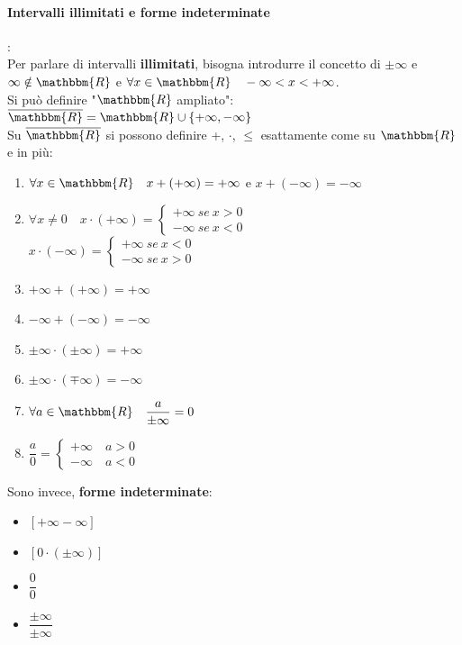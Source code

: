 \documentclass[12pt]{report}
\begin{document}
	\paragraph{Intervalli illimitati e forme indeterminate}: \\
	Per parlare di intervalli \textbf{illimitati}, bisogna introdurre il concetto di $\pm \infty$ e $\infty \notin \mathbbm{R}$ e $\forall x \in \mathbbm{R} \quad -\infty < x < +\infty$. \\
	Si può definire "$\mathbbm{R}$ ampliato": $\overline{\mathbbm{R}} = \mathbbm{R} \cup \{+\infty, -\infty\}$ \\
	Su $\overline{\mathbbm{R}}$ si possono definire +, $\cdot$, $\leq$ esattamente come su $\mathbbm{R}$ e in più:
	\begin{enumerate}
		\item $\forall x \in \mathbbm{R} \quad x + (+\infty) = +\infty$ e $x + (-\infty) = -\infty$
		\item $\forall x \neq 0 \quad x \cdot (+\infty) = \begin{cases}
			+\infty \ se \ x > 0 \\
			-\infty \ se \ x < 0
		\end{cases}$ \\
		$x \cdot (-\infty) = \begin{cases}
			+\infty \ se \ x < 0 \\
			-\infty \ se \ x > 0
		\end{cases}$
		\item $+\infty + (+\infty) = +\infty$
		\item $-\infty + (-\infty) = -\infty$
		\item $\pm\infty \cdot (\pm\infty) = +\infty$
		\item $\pm\infty \cdot (\mp\infty) = -\infty$
		\item $\forall a \in \mathbbm{R} \quad \dfrac{a}{\pm\infty} = 0$
		\item $\dfrac{a}{0} = \begin{cases}
			+\infty \quad a > 0 \\
			-\infty \quad a < 0
		\end{cases}$
	\end{enumerate}
	Sono invece, \textbf{forme indeterminate}:
	\begin{itemize}
		\item $[+\infty -\infty]$
		\item $[0 \cdot (\pm\infty)]$
		\item $\dfrac{0}{0}$
		\item $\dfrac{\pm\infty}{\pm\infty}$
	\end{itemize}
\end{document}
